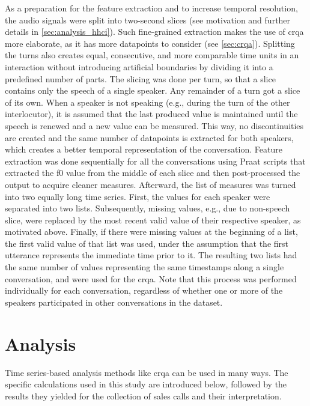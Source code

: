 As a preparation for the feature extraction and to increase temporal resolution, the audio signals were split into two-second slices (see motivation and further details in \cref{sec:analysis_hhci}).
Such fine-grained extraction makes the use of \ac{crqa} more elaborate, as it has more datapoints to consider (see \cref{sec:crqa}).
Splitting the turns also creates equal, consecutive, and more comparable time units in an interaction without introducing artificial boundaries by dividing it into a predefined number of parts.
The slicing was done per turn, so that a slice contains only the speech of a single speaker.
Any remainder of a turn got a slice of its own.
When a speaker is not speaking (e.g., during the turn of the other interlocutor), it is assumed that the last produced value is maintained until the speech is renewed and a new value can be measured.
This way, no discontinuities are created and the same number of datapoints is extracted for both speakers, which creates a better temporal representation of the conversation.
Feature extraction was done sequentially for all the conversations using Praat \citep{Boersma2001praat} scripts that extracted the \ac{f0} value from the middle of each slice and then post-processed the output to acquire cleaner measures.
Afterward, the list of measures was turned into two equally long time series.
First, the values for each speaker were separated into two lists.
Subsequently, missing values, e.g., due to non-speech slice, were replaced by the most recent valid value of their respective speaker, as motivated above.
Finally, if there were missing values at the beginning of a list, the first valid value of that list was used, under the assumption that the first utterance represents the immediate time prior to it.
The resulting two lists had the same number of values representing the same timestamps along a single conversation, and were used for the \ac{crqa}.
Note that this process was performed individually for each conversation, regardless of whether one or more of the speakers participated in other conversations in the dataset.

\section{Analysis}
\label{sec:analysis_hhi}

Time series-based analysis methods like \ac{crqa} can be used in many ways.
The specific calculations used in this study are introduced below, followed by the results they yielded for the collection of sales calls and their interpretation.

